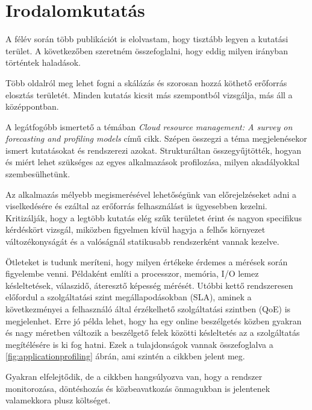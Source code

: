 \chapter{Irodalomkutatás}
\label{sec:Publications}
A félév során több publikációt is elolvastam, hogy tisztább legyen a kutatási terület. A következőben szeretném összefoglalni, hogy eddig milyen irányban történtek haladások.

Több oldalról meg lehet fogni a skálázás és szorosan hozzá köthető erőforrás elosztás területét. Minden kutatás kicsit más szempontból vizsgálja, más áll a középpontban.

A legátfogóbb ismertető a témában \emph{Cloud resource management: A survey on forecasting and profiling models}\citep{CloudResourceManagement} című cikk. Szépen összegzi a téma megjelenésekor ismert kutatásokat és rendszerezi azokat. Strukturáltan összegyűjtötték, hogyan és miért lehet szükséges az egyes alkalmazások profilozása, milyen akadályokkal szembesülhetünk.

Az alkalmazás mélyebb megismerésével lehetőségünk van előrejelzéseket adni a viselkedésére és ezáltal az erőforrás felhasználást is ügyesebben kezelni. Kritizálják, hogy a legtöbb kutatás elég szűk területet érint és nagyon specifikus kérdéskört vizsgál, miközben figyelmen kívül hagyja a felhős környezet változékonyságát és a valóságnál statikusabb rendszerként vannak kezelve. 

Ötleteket is tudunk meríteni, hogy milyen értékeke érdemes a mérések során figyelembe venni.
Példaként említi  a processzor, memória, I/O lemez késleltetések, válaszidő, áteresztő képesség mérését.
Utóbbi kettő rendszeresen előfordul a szolgáltatási szint megállapodásokban (SLA), aminek a következményei a felhasználó által érzékelhető szolgáltatási szintben (QoE) is megjelenhet.
Erre jó példa lehet, hogy ha egy online beszélgetés közben gyakran és nagy méretben változik a beszélgető felek közötti késleltetés az a szolgáltatás megítélésére is ki fog hatni.
Ezek a tulajdonságok vannak összefoglalva a \ref{fig:applicationprofiling} ábrán, ami szintén a cikkben jelent meg.

Gyakran elfelejtődik, de a cikkben hangsúlyozva van, hogy a rendszer monitorozása, döntéshozás és közbeavatkozás önmagukban is jelentenek valamekkora plusz költséget. \\



